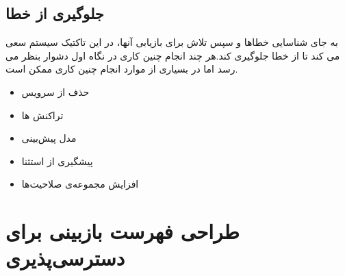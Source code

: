 \subsection{جلوگیری از خطا}
به جای شناسایی خطاها و سپس تلاش برای بازیابی آنها، در این تاکتیک سیستم سعی می کند تا از خطا جلوگیری کند.هر چند انجام چنین کاری در نگاه اول دشوار بنظر می رسد اما در بسیاری از موارد انجام چنین کاری ممکن است.
\begin{itemize}
\item 
حذف از سرویس 
\item
تراکنش ها 
\item
مدل پیش‌بینی 
\item
پیشگیری از استثنا 
\item
افزایش مجموعه‌ی صلاحیت‌ها 
\end{itemize}
\section{طراحی فهرست بازبینی برای دسترسی‌پذیری}














